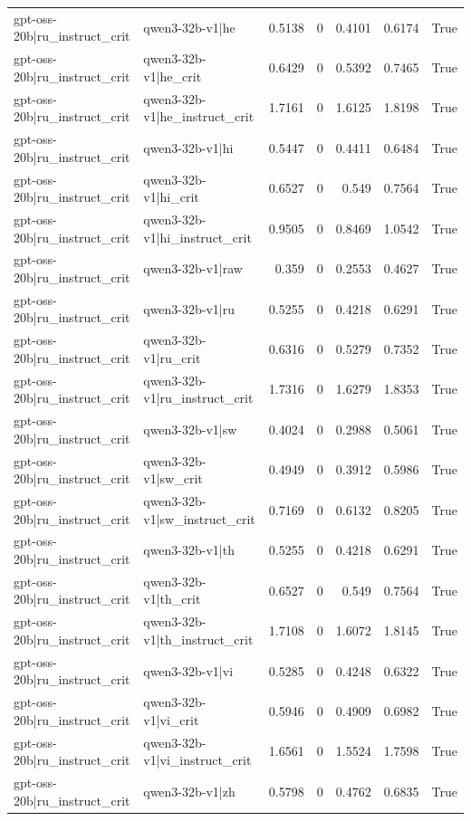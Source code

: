 \begin{table}
\begin{tabular}{l l r r r r l}
gpt-oss-20b|ru_instruct_crit & qwen3-32b-v1|he & 0.5138 & 0 & 0.4101 & 0.6174 & True \\
gpt-oss-20b|ru_instruct_crit & qwen3-32b-v1|he_crit & 0.6429 & 0 & 0.5392 & 0.7465 & True \\
gpt-oss-20b|ru_instruct_crit & qwen3-32b-v1|he_instruct_crit & 1.7161 & 0 & 1.6125 & 1.8198 & True \\
gpt-oss-20b|ru_instruct_crit & qwen3-32b-v1|hi & 0.5447 & 0 & 0.4411 & 0.6484 & True \\
gpt-oss-20b|ru_instruct_crit & qwen3-32b-v1|hi_crit & 0.6527 & 0 & 0.549 & 0.7564 & True \\
gpt-oss-20b|ru_instruct_crit & qwen3-32b-v1|hi_instruct_crit & 0.9505 & 0 & 0.8469 & 1.0542 & True \\
gpt-oss-20b|ru_instruct_crit & qwen3-32b-v1|raw & 0.359 & 0 & 0.2553 & 0.4627 & True \\
gpt-oss-20b|ru_instruct_crit & qwen3-32b-v1|ru & 0.5255 & 0 & 0.4218 & 0.6291 & True \\
gpt-oss-20b|ru_instruct_crit & qwen3-32b-v1|ru_crit & 0.6316 & 0 & 0.5279 & 0.7352 & True \\
gpt-oss-20b|ru_instruct_crit & qwen3-32b-v1|ru_instruct_crit & 1.7316 & 0 & 1.6279 & 1.8353 & True \\
gpt-oss-20b|ru_instruct_crit & qwen3-32b-v1|sw & 0.4024 & 0 & 0.2988 & 0.5061 & True \\
gpt-oss-20b|ru_instruct_crit & qwen3-32b-v1|sw_crit & 0.4949 & 0 & 0.3912 & 0.5986 & True \\
gpt-oss-20b|ru_instruct_crit & qwen3-32b-v1|sw_instruct_crit & 0.7169 & 0 & 0.6132 & 0.8205 & True \\
gpt-oss-20b|ru_instruct_crit & qwen3-32b-v1|th & 0.5255 & 0 & 0.4218 & 0.6291 & True \\
gpt-oss-20b|ru_instruct_crit & qwen3-32b-v1|th_crit & 0.6527 & 0 & 0.549 & 0.7564 & True \\
gpt-oss-20b|ru_instruct_crit & qwen3-32b-v1|th_instruct_crit & 1.7108 & 0 & 1.6072 & 1.8145 & True \\
gpt-oss-20b|ru_instruct_crit & qwen3-32b-v1|vi & 0.5285 & 0 & 0.4248 & 0.6322 & True \\
gpt-oss-20b|ru_instruct_crit & qwen3-32b-v1|vi_crit & 0.5946 & 0 & 0.4909 & 0.6982 & True \\
gpt-oss-20b|ru_instruct_crit & qwen3-32b-v1|vi_instruct_crit & 1.6561 & 0 & 1.5524 & 1.7598 & True \\
gpt-oss-20b|ru_instruct_crit & qwen3-32b-v1|zh & 0.5798 & 0 & 0.4762 & 0.6835 & True \\

\end{tabular}
\end{table}
